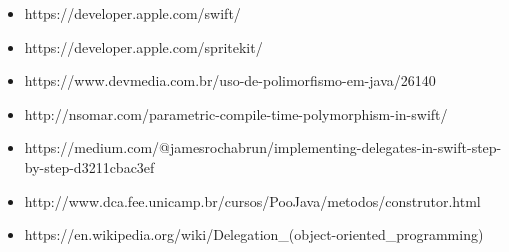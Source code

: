 \documentclass[rel_mlp]{iiufrgs}
\begin{document}
\begin{itemize}
\setlength{\itemindent}{1em}
    \item https://developer.apple.com/swift/
    \item https://developer.apple.com/spritekit/
    \item https://www.devmedia.com.br/uso-de-polimorfismo-em-java/26140
    \item http://nsomar.com/parametric-compile-time-polymorphism-in-swift/
    \item https://medium.com/@jamesrochabrun/implementing-delegates-in-swift-step-by-step-d3211cbac3ef
    \item http://www.dca.fee.unicamp.br/cursos/PooJava/metodos/construtor.html
    \item https://en.wikipedia.org/wiki/Delegation\_(object-oriented\_programming)
\end{itemize}
\end{document}
